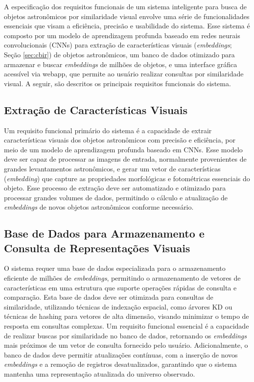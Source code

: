 A especificação dos requisitos funcionais de um sistema inteligente para busca de objetos astronômicos por similaridade visual envolve uma série de funcionalidades essenciais que visam a eficiência, precisão e usabilidade do sistema. Esse sistema é composto por um modelo de aprendizagem profunda baseado em redes neurais convolucionais (CNNs) para extração de características visuais (\emph{embeddings}; Seção \ref{sec:cbir}) de objetos astronômicos, um banco de dados otimizado para armazenar e buscar \emph{embeddings} de milhões de objetos, e uma interface gráfica acessível via webapp, que permite ao usuário realizar consultas por similaridade visual. A seguir, são descritos os principais requisitos funcionais do sistema.






\subsection{Extração de Características Visuais}
\label{sec:req-embeddings}

Um requisito funcional primário do sistema é a capacidade de extrair características visuais dos objetos astronômicos com precisão e eficiência, por meio de um modelo de aprendizagem profunda baseado em CNNs. Esse modelo deve ser capaz de processar as imagens de entrada, normalmente provenientes de grandes levantamentos astronômicos, e gerar um vetor de características (\emph{embedding}) que capture as propriedades morfológicas e fotométricas essenciais do objeto. Esse processo de extração deve ser automatizado e otimizado para processar grandes volumes de dados, permitindo o cálculo e atualização de \emph{embeddings} de novos objetos astronômicos conforme necessário.






\subsection{Base de Dados para Armazenamento e Consulta de Representações Visuais}
\label{sec:req-db}

O sistema requer uma base de dados especializada para o armazenamento eficiente de milhões de \emph{embeddings}, permitindo o armazenamento de vetores de características em uma estrutura que suporte operações rápidas de consulta e comparação. Esta base de dados deve ser otimizada para consultas de similaridade, utilizando técnicas de indexação espacial, como árvores KD ou técnicas de hashing para vetores de alta dimensão, visando minimizar o tempo de resposta em consultas complexas. Um requisito funcional essencial é a capacidade de realizar buscas por similaridade no banco de dados, retornando os \emph{embeddings} mais próximos de um vetor de consulta fornecido pelo usuário. Adicionalmente, o banco de dados deve permitir atualizações contínuas, com a inserção de novos \emph{embeddings} e a remoção de registros desatualizados, garantindo que o sistema mantenha uma representação atualizada do universo observado.






